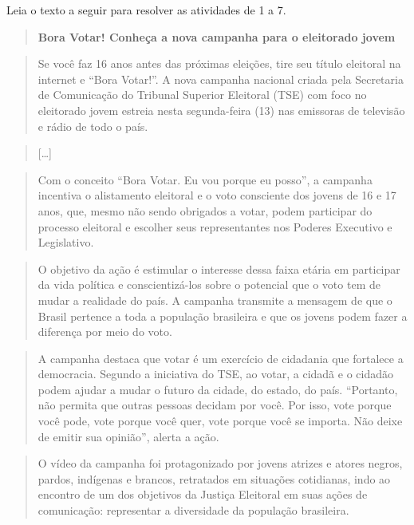 Leia o texto a seguir para resolver as atividades de 1 a 7.

\begin{quote}
\centering\textbf{Bora Votar! Conheça a nova campanha para o eleitorado jovem}
\end{quote}


\begin{quote}
Se você faz 16 anos antes das próximas eleições, tire seu título
eleitoral na internet e ``Bora Votar!''. A nova campanha nacional criada
pela Secretaria de Comunicação do Tribunal Superior Eleitoral (TSE) com
foco no eleitorado jovem estreia nesta segunda-feira (13) nas emissoras
de televisão e rádio de todo o país.
\end{quote}

\begin{quote}
{[}\ldots{]}
\end{quote}

\begin{quote}
Com o conceito ``Bora Votar. Eu vou porque eu posso'', a campanha
incentiva o alistamento eleitoral e o voto consciente dos jovens de 16 e
17 anos, que, mesmo não sendo obrigados a votar, podem participar do
processo eleitoral e escolher seus representantes nos Poderes Executivo
e Legislativo.
\end{quote}

\begin{quote}
O objetivo da ação é estimular o interesse dessa faixa etária em
participar da vida política e conscientizá-los sobre o potencial que o
voto tem de mudar a realidade do país. A campanha transmite a mensagem
de que o Brasil pertence a toda a população brasileira e que os jovens
podem fazer a diferença por meio do voto.
\end{quote}

\begin{quote}
A campanha destaca que votar é um exercício de cidadania que fortalece a
democracia. Segundo a iniciativa do TSE, ao votar, a cidadã e o cidadão
podem ajudar a mudar o futuro da cidade, do estado, do país. ``Portanto,
não permita que outras pessoas decidam por você. Por isso, vote porque
você pode, vote porque você quer, vote porque você se importa. Não deixe
de emitir sua opinião'', alerta a ação.
\end{quote}

\begin{quote}
O vídeo da campanha foi protagonizado por jovens atrizes e atores
negros, pardos, indígenas e brancos, retratados em situações cotidianas,
indo ao encontro de um dos objetivos da Justiça Eleitoral em suas ações
de comunicação: representar a diversidade da população brasileira.
\end{quote}

